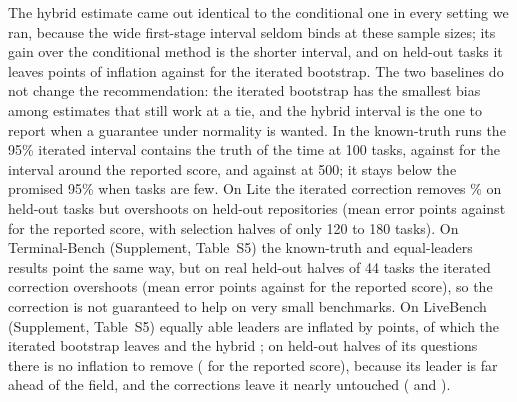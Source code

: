\documentclass[11pt]{article}
\begin{document}
The hybrid estimate came out identical to the conditional one in every setting we ran, because the wide first-stage interval seldom binds at these sample sizes; its gain over the conditional method is the shorter interval, and on held-out tasks it leaves \NumVTwoHybBias{} points of inflation against \NumVTwoIterBias{} for the iterated bootstrap.
The two baselines do not change the recommendation: the iterated bootstrap has the smallest bias among estimates that still work at a tie, and the hybrid interval is the one to report when a guarantee under normality is wanted.
In the known-truth runs the 95\% iterated interval contains the truth \NumVOneNAIterCov{} of the time at 100 tasks, against \NumVOneNANaiveCov{} for the interval around the reported score, and \NumVOneNCIterCov{} against \NumVOneNCNaiveCov{} at 500; it stays below the promised 95\% when tasks are few.
On Lite the iterated correction removes \NumLiteTwoReduction\% on held-out tasks but overshoots on held-out repositories (mean error \NumLiteThreeIterBias{} points against \NumLiteThreeNaiveBias{} for the reported score, with selection halves of only 120 to 180 tasks).
On Terminal-Bench (Supplement, Table~S5) the known-truth and equal-leaders results point the same way, but on real held-out halves of 44 tasks the iterated correction overshoots (mean error \NumTBTwoIterBias{} points against \NumTBTwoNaiveBias{} for the reported score), so the correction is not guaranteed to help on very small benchmarks.
On LiveBench (Supplement, Table~S5) equally able leaders are inflated by \NumLBBunchNaiveBias{} points, of which the iterated bootstrap leaves \NumLBBunchIterBias{} and the hybrid \NumLBBunchHybBias{}; on held-out halves of its questions there is no inflation to remove (\NumLBTwoNaiveBias{} for the reported score), because its leader is far ahead of the field, and the corrections leave it nearly untouched (\NumLBTwoIterBias{} and \NumLBTwoHybBias{}).
\end{document}
